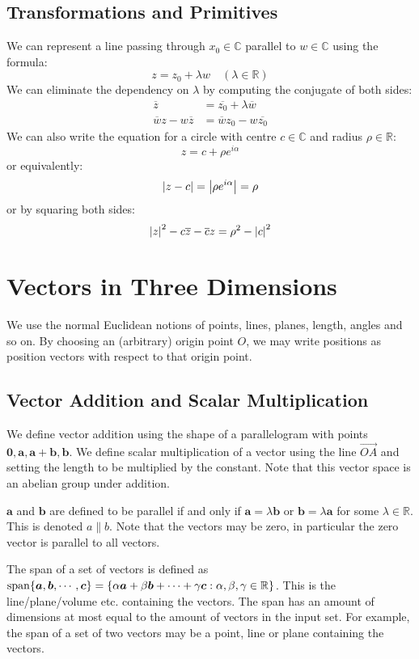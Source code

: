 \documentclass{article}
\begin{document}
	\subsection{Transformations and Primitives}
	We can represent a line passing through $x_0\in \mathbb C$ parallel to $w \in \mathbb C$ using the formula:
	\[ z = z_0 + \lambda w\quad(\lambda \in \mathbb R) \]
	We can eliminate the dependency on $\lambda$ by computing the conjugate of both sides:
	\begin{align*}
		\overline{z} &= \overline{z_0} + \lambda \overline{w} \\
		\overline{w}z - w\overline{z} &= \overline{w}z_0 - w\overline{z_0}
	\end{align*} %
	We can also write the equation for a circle with centre $c \in \mathbb C$ and radius $\rho \in \mathbb R$:
	\[ z = c + \rho e^{i\alpha} \]
	or equivalently:
	\[ \abs{z - c} = \abs{\rho e^{i\alpha}} = \rho \]
	or by squaring both sides:
	\[ \abs{z}^2 - c\overline{z} - \overline{c}z = \rho^2 - \abs{c}^2 \]
	
	\section{Vectors in Three Dimensions}
	We use the normal Euclidean notions of points, lines, planes, length, angles and so on. By choosing an (arbitrary) origin point $O$, we may write positions as position vectors with respect to that origin point.
	
	\subsection{Vector Addition and Scalar Multiplication}
	We define vector addition using the shape of a parallelogram with points $\bm 0, \bm a, \bm a + \bm b, \bm b$. We define scalar multiplication of a vector using the line $\overrightarrow{OA}$ and setting the length to be multiplied by the constant. Note that this vector space is an abelian group under addition.
	\begin{definition}
		$\bm a$ and $\bm b$ are defined to be parallel if and only if $\bm a = \lambda \bm b$ or $\bm b = \lambda \bm a$ for some $\lambda \in \mathbb R$. This is denoted $a \parallel b$. Note that the vectors may be zero, in particular the zero vector is parallel to all vectors.
	\end{definition}
	\begin{definition}
		The span of a set of vectors is defined as $\operatorname{span} \{\bm a, \bm b, \cdots, \bm c\} = \{ \alpha \bm a + \beta \bm b + \cdots + \gamma \bm c: \alpha, \beta, \gamma \in \mathbb R \}$. This is the line/plane/volume etc. containing the vectors. The span has an amount of dimensions at most equal to the amount of vectors in the input set. For example, the span of a set of two vectors may be a point, line or plane containing the vectors.
	\end{definition}
\end{document}
